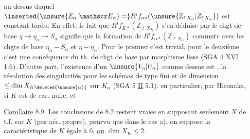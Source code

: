 au dessus duquel $\inserted{\unsure{E_\alpha|\mathscr E_\alpha}=}R^if_{\alpha *}(\unsure{\mathbb Z_{\ell\,X_\alpha}|Z_{\ell\,X_\alpha}})$ est constant tordu. En effet, le fait que  $R^if_{K*}(\mathbb Z_{\ell\,X_K})$ s'en déduise par le chgt de base $\eta\longrightarrow\eta_\alpha\longrightarrow S_\alpha$ signifie que la formation de $R^if_{\alpha *}(\mathbb Z_{\ell\,X_\alpha})$ commute avec les chgts de base $\eta_\alpha-S_\alpha$ et $\eta-\eta_\alpha$. Pour le premier c'est trivial, pour le deuxième c'est une conséquence du th. de chgt de base  par morphisme lisse (SGA 4 \uline{XVI} 1.6). 
D'autre part, l'existence d'un $\unsure{V_\alpha|U_\alpha}$ comme dessus est ,  la résolution des singularités  pour les schémas de type fini et de dimension $\leq\dim X_{K\deleted{\unsure{\alpha}}}$ sur $K_\alpha$ (SGA 5 \uline{II} 5.1).   en particulier, par Hironaka, si $K$ est de car. nulle, et  


\uline{Corollaire} 8.9. Les conclusions de 8.2 restent vraies en supposant seulement $X$ de t.f. sur $K$ (pas néc. propre), pourvu que dans le cas a), on suppose la caractéristique de $K$ égale à $0$, \uline{ou} $\dim X_K\leq2$.
